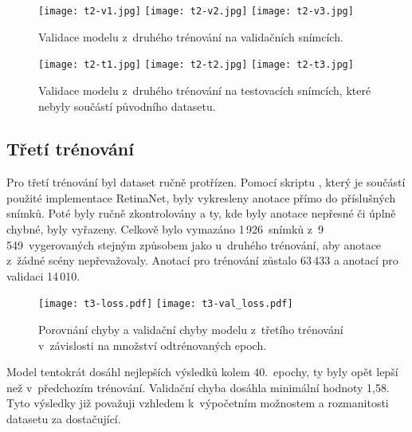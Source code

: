 \begin{figure}[H]
    \centering
    \texttt{[image: t2-v1.jpg]}\hfill
    \texttt{[image: t2-v2.jpg]}\hfill
    \texttt{[image: t2-v3.jpg]}
    \caption[Validace modelu z~druhého trénování na validačních snímcích]{Validace modelu z~druhého trénování na validačních snímcích.}
    \label{fig_train2_val_img}
\end{figure}

\begin{figure}[H]
    \centering
    \texttt{[image: t2-t1.jpg]}\hfill
    \texttt{[image: t2-t2.jpg]}\hfill
    \texttt{[image: t2-t3.jpg]}
    \caption[Validace modelu z~druhého trénování na testovacích snímcích]{Validace modelu z~druhého trénování na testovacích snímcích, které nebyly součástí původního datasetu.}
    \label{fig_train2_test_img}
\end{figure}


\subsection*{Třetí trénování}

Pro třetí trénování byl dataset ručně protřízen. Pomocí skriptu , který je součástí použité implementace RetinaNet, byly vykresleny anotace přímo do příslušných snímků. Poté byly ručně zkontrolovány a ty, kde byly anotace nepřesné či úplně chybné, byly vyřazeny. Celkově bylo vymazáno 1\,926~snímků z~9\,549~vygerovaných stejným způsobem jako u~druhého trénování, aby anotace z~žádné scény nepřevažovaly. Anotací pro trénování zůstalo 63\,433 a anotací pro validaci 14\,010.

\begin{figure}[H]
    \centering
    \texttt{[image: t3-loss.pdf]}\hfill
    \texttt{[image: t3-val\_loss.pdf]}
    \caption[Chyba a validační chyba třetího trénování]{Porovnání chyby a validační chyby modelu z~třetího trénování v~závislosti na množství odtrénovaných epoch.}
    \label{fig_train3_graph}
\end{figure}

Model tentokrát dosáhl nejlepších výsledků kolem 40.~epochy, ty byly opět lepší než v~předchozím trénování. Validační chyba dosáhla minimální hodnoty 1,58. Tyto výsledky již považuji vzhledem k~výpočetním možnostem a rozmanitosti datasetu za dostačující.

